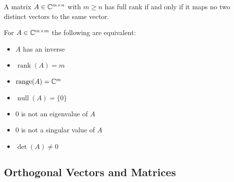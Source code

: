 \documentclass[12pt]{article}
\begin{document}
\begin{definition}[Rank]
\end{definition}

\begin{theorem}
    A matrix \( A\in \mathbb{C}^{m\times n} \) with \( m\geq n \) has full rank if and only if it maps no two distinct vectors to the same vector.
\end{theorem}

\begin{definition}[Inverse]
\end{definition}

\begin{theorem}
    For \( A\in\mathbb{C}^{m\times m} \) the following are equivalent:
    \begin{itemize}[nolistsep]
        \item \( A \) has an inverse
        \item \( \operatorname{rank}(A) = m \)
        \item \( \operatorname{range}(A) = \mathbb{C}^{m} \)
        \item \( \operatorname{null}(A) = \{0\} \)
        \item 0 is not an eigenvalue of \( A \)
        \item 0 is not a singular value of \( A \)
        \item \( \operatorname{det}(A) \neq 0 \)
    \end{itemize}
\end{theorem}

\subsection{Orthogonal Vectors and Matrices}

\begin{definition}
\end{definition}

\begin{definition}
\end{definition}

\begin{definition}
\end{definition}

\begin{definition}[bilinear]
\end{definition}

\begin{definition}[orthogonal]
\end{definition}
\end{document}
